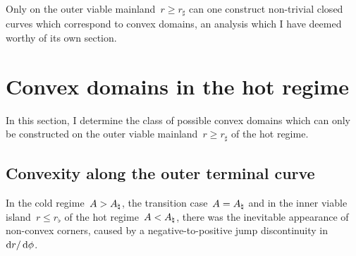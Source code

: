 Only on the outer viable mainland~$r \ge r_\sharp$
can one construct non-trivial closed curves
which correspond to convex domains,
an analysis which I have deemed worthy of its own section.

\section{Convex domains in the hot regime}
\label{sec:line.convex}

In this section,
I determine the class of possible convex domains
which can only be constructed
on the outer viable mainland~$r \ge r_\sharp$
of the hot regime.

\subsection{Convexity along the outer terminal curve}
\label{sec:line.convex.terminal}

In the cold regime~$A > A_\natural$, the transition case~$A = A_\natural$
and in the inner viable island~$r \le r_\flat$
of the hot regime~$A < A_\natural$,
there was the inevitable appearance of non-convex corners,
caused by a negative-to-positive jump discontinuity in~$\mathop{}\!\mathrm{d} r / \mathop{}\!\mathrm{d}\phi$.

